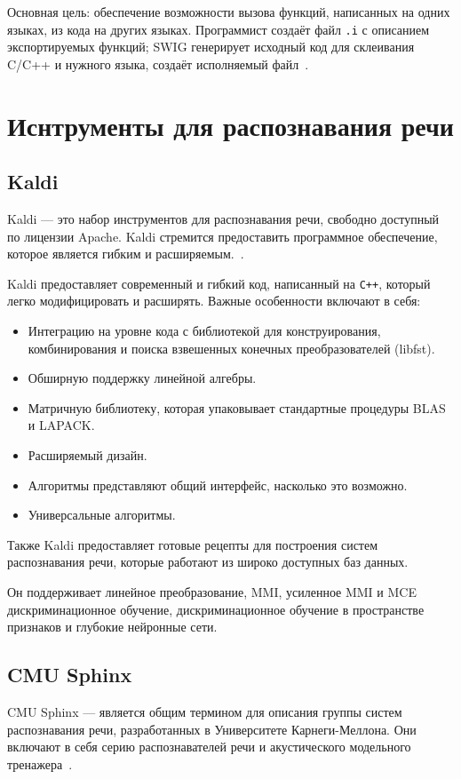 Основная цель: обеспечение возможности вызова
функций, написанных на одних языках, из кода на других языках. Программист
создаёт файл \texttt{.i} с описанием экспортируемых функций; SWIG генерирует исходный код
для склеивания C/C++ и нужного языка, создаёт исполняемый файл~\cite{swig}.



\section{Иснтрументы для распознавания речи}

\subsection{Kaldi}
Kaldi --- это набор инструментов для распознавания речи, свободно доступный по
лицензии Apache. Kaldi стремится предоставить программное обеспечение, которое
является гибким и расширяемым.~\cite{kaldi}.

Kaldi предоставляет современный и гибкий код, написанный на \texttt{C++}, который
легко модифицировать и расширять. Важные особенности включают в себя:

\begin{itemize}
    \item Интеграцию на уровне кода с библиотекой для конструирования, комбинирования
        и поиска взвешенных конечных преобразователей (libfst).
    \item Обширную поддержку линейной алгебры.
    \item Матричную библиотеку, которая упаковывает стандартные процедуры BLAS и LAPACK.
    \item Расширяемый дизайн.
    \item Алгоритмы представляют общий интерфейс, насколько это возможно.
    \item Универсальные алгоритмы.
\end{itemize}

Также Kaldi предоставляет готовые рецепты для построения систем \\
\mbox{распознавания} речи, которые работают из широко доступных баз данных.

Он поддерживает линейное преобразование, MMI,
усиленное MMI и MCE дискриминационное обучение, дискриминационное обучение в
пространстве признаков и глубокие нейронные сети.

\subsection{CMU Sphinx}
CMU Sphinx --- является общим термином для описания группы систем распознавания
речи, разработанных в Университете Карнеги-Меллона. Они включают в себя серию
распознавателей речи и акустического модельного тренажера~\cite{sphinx}.


